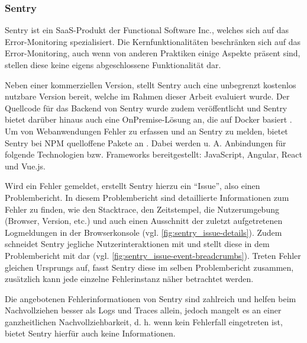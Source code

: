 \subsubsection{Sentry}
\label{subsec:sentry}

Sentry \cite{Sentry} ist ein SaaS-Produkt der Functional Software Inc., welches sich auf das Error-Monitoring spezialisiert. Die Kernfunktionalitäten beschränken sich auf das Error-Monitoring, auch wenn von anderen Praktiken einige Aspekte präsent sind, stellen diese keine eigens abgeschlossene Funktionalität dar.

Neben einer kommerziellen Version, stellt Sentry auch eine unbegrenzt kostenlos nutzbare Version bereit, welche im Rahmen dieser Arbeit evaluiert wurde. Der Quellcode für das Backend von Sentry wurde zudem veröffentlicht und Sentry bietet darüber hinaus auch eine OnPremise-Lösung an, die auf Docker basiert \cite{SentrySelfHosted}. Um von Webanwendungen Fehler zu erfassen und an Sentry zu melden, bietet Sentry bei NPM \cite{NPM} quelloffene Pakete an \cite{SentryJSGithub}. Dabei werden u. A. Anbindungen für folgende Technologien bzw. Frameworks bereitgestellt: JavaScript, Angular, React und Vue.js.

Wird ein Fehler gemeldet, erstellt Sentry hierzu ein \enquote{Issue}, also einen Problembericht. In diesem Problembericht sind detaillierte Informationen zum Fehler zu finden, wie den Stacktrace, den Zeitstempel, die Nutzerumgebung (Browser, Version, etc.) und auch einen Ausschnitt der zuletzt aufgetretenen Logmeldungen in der Browserkonsole (vgl. \autoref{fig:sentry_issue-details}). Zudem schneidet Sentry jegliche Nutzerinteraktionen mit und stellt diese in dem Problembericht mit dar (vgl. \autoref{fig:sentry_issue-event-breadcrumbs}). Treten Fehler gleichen Ursprungs auf, fasst Sentry diese im selben Problembericht zusammen, zusätzlich kann jede einzelne Fehlerinstanz näher betrachtet werden.

Die angebotenen Fehlerinformationen von Sentry sind zahlreich und helfen beim Nachvollziehen besser als Logs und Traces allein, jedoch mangelt es an einer ganzheitlichen Nachvollziehbarkeit, d. h. wenn kein Fehlerfall eingetreten ist, bietet Sentry hierfür auch keine Informationen.

